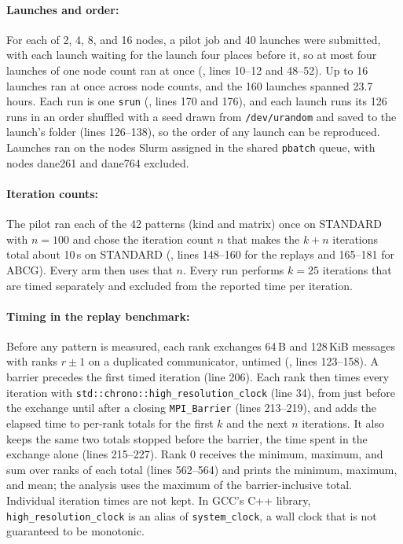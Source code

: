 \documentclass[11pt]{article}
\begin{document}
\paragraph{Launches and order:} For each of 2, 4, 8, and 16 nodes, a pilot job and 40
launches were submitted, with each launch waiting for the launch four places before it,
so at most four launches of one node count ran at once (,
lines 10--12 and 48--52). Up to 16 launches ran at once across node counts, and the 160
launches spanned 23.7 hours. Each run is one \texttt{srun}
(, lines 170 and 176), and each launch runs its 126
runs in an order shuffled with a seed drawn from \texttt{/dev/urandom} and saved to the
launch's folder (lines 126--138), so the order of any launch can be reproduced. Launches
ran on the nodes Slurm assigned in the shared \texttt{pbatch} queue, with nodes dane261
and dane764 excluded.

\paragraph{Iteration counts:} The pilot ran each of the 42 patterns (kind and matrix) once
on STANDARD with $n=100$ and chose the iteration count $n$ that makes the $k+n$ iterations
total about 10\,s on STANDARD (, lines 148--160 for the
replays and 165--181 for ABCG). Every arm then uses that $n$. Every run performs $k=25$
iterations that are timed separately and excluded from the reported time per iteration.

\paragraph{Timing in the replay benchmark:} Before any pattern is measured, each rank
exchanges 64\,B and 128\,KiB messages with ranks $r\pm1$ on a duplicated communicator,
untimed (, lines 123--158). A barrier precedes the first timed
iteration (line 206). Each rank then times every iteration with
\texttt{std::chrono::high\_resolution\_clock} (line 34), from just before the exchange
until after a closing \texttt{MPI\_Barrier} (lines 213--219), and adds the elapsed time
to per-rank totals for the first $k$ and the next $n$ iterations. It also keeps the same
two totals stopped before the barrier, the time spent in the exchange alone (lines
215--227). Rank 0 receives the minimum, maximum, and sum over ranks of each total (lines
562--564) and prints the minimum, maximum, and mean; the analysis uses the maximum of the
barrier-inclusive total. Individual iteration times are not kept. In GCC's C++ library,
\texttt{high\_resolution\_clock} is an alias of \texttt{system\_clock}, a wall clock that
is not guaranteed to be monotonic.
\end{document}
